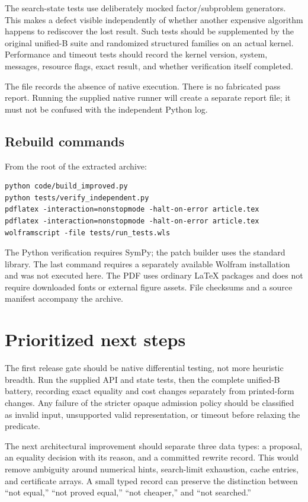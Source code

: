 \documentclass[11pt,a4paper]{article}
\newcommand{\code}[1]{\texttt{\detokenize{#1}}}
\theoremstyle{remark}\newtheorem{remark}[theorem]{Remark}
\begin{document}
The search-state tests use deliberately mocked factor/subproblem generators. This makes a defect visible independently of whether another expensive algorithm happens to rediscover the lost result. Such tests should be supplemented by the original unified-B suite and randomized structured families on an actual kernel. Performance and timeout tests should record the kernel version, system, messages, resource flags, exact result, and whether verification itself completed.

The \code{evidence/native_execution_status.json} file records the absence of native execution. There is no fabricated pass report. Running the supplied native runner will create a separate report file; it must not be confused with the independent Python log.

\subsection{Rebuild commands}
From the root of the extracted archive:
\begin{lstlisting}[language={}]
python code/build_improved.py
python tests/verify_independent.py
pdflatex -interaction=nonstopmode -halt-on-error article.tex
pdflatex -interaction=nonstopmode -halt-on-error article.tex
wolframscript -file tests/run_tests.wls
\end{lstlisting}
The Python verification requires SymPy; the patch builder uses the standard library. The last command requires a separately available Wolfram installation and was not executed here. The PDF uses ordinary LaTeX packages and does not require downloaded fonts or external figure assets. File checksums and a source manifest accompany the archive.

\section{Prioritized next steps}
The first release gate should be native differential testing, not more heuristic breadth. Run the supplied API and state tests, then the complete unified-B battery, recording exact equality and cost changes separately from printed-form changes. Any failure of the stricter opaque admission policy should be classified as invalid input, unsupported valid representation, or timeout before relaxing the predicate.

The next architectural improvement should separate three data types: a proposal, an equality decision with its reason, and a committed rewrite record. This would remove ambiguity around numerical hints, search-limit exhaustion, cache entries, and certificate arrays. A small typed record can preserve the distinction between ``not equal,'' ``not proved equal,'' ``not cheaper,'' and ``not searched.''
\end{document}
